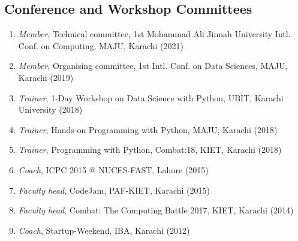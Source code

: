 \documentclass[a4paper, 10pt]{article}
\begin{document}
\subsection*{\textcolor{NavyBlue}{Conference and Workshop Committees}}
\begin{enumerate}
\itemsep = 0em
\item \emph{ Member}, Technical committee, 1st Mohammad Ali Jinnah University Intl. Conf. on Computing, MAJU, Karachi (2021)
\item \emph{ Member}, Organising committee, 1st Intl. Conf. on Data Sciences, MAJU, Karachi (2019)
\item \emph{ Trainer}, 1-Day Workshop on Data Science with Python, UBIT, Karachi University (2018)
\item \emph{ Trainer}, Hands-on Programming with Python, MAJU, Karachi (2018)
\item \emph{ Trainer}, Programming with Python, Combat:18, KIET, Karachi (2018)
\item \emph{ Coach}, ICPC 2015 @ NUCES-FAST, Lahore (2015)
\item \emph{ Faculty head}, CodeJam, PAF-KIET, Karachi (2015)
\item \emph{ Faculty head}, Combat: The Computing Battle 2017, KIET, Karachi (2014)
\item \emph{ Coach}, Startup-Weekend, IBA, Karachi (2012)
\end{enumerate}
\end{document}
